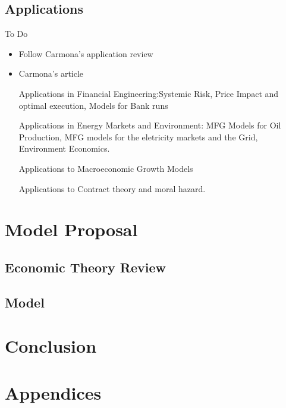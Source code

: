 \documentclass{article}
\begin{document}
\subsection{Applications}
To Do
\begin{itemize}
    \item Follow Carmona's application review
    \item Carmona's article 
    
    Applications in Financial Engineering:Systemic Risk, Price Impact and optimal execution, Models for Bank runs
    
    Applications in Energy Markets and Environment: MFG Models for Oil Production, MFG models for the eletricity markets and the Grid, Environment Economics.

    Applications to Macroeconomic Growth Models

    Applications to Contract theory and moral hazard.
\end{itemize}



\section{Model Proposal}\label{model_proposal}

\subsection{Economic Theory Review}\label{model_proposal:motivation}




\subsection{Model}\label{model_proposal:proposal}





\section{Conclusion}

\appendix
{}
\section*{Appendices}
\end{document}
